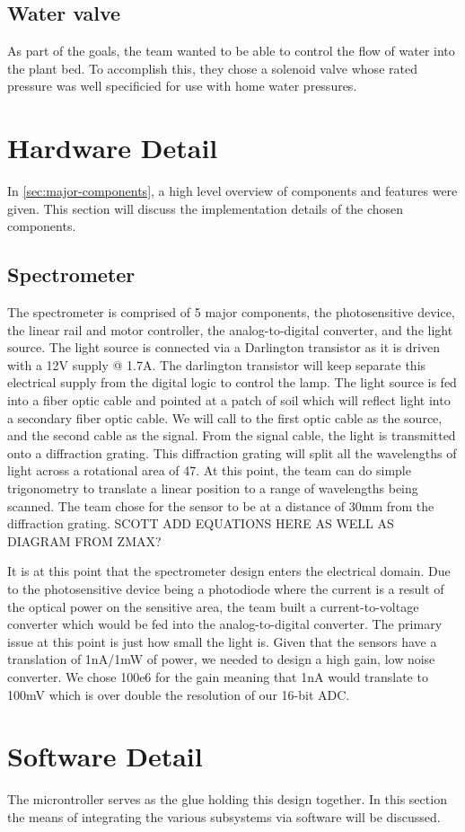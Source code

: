 \documentclass[journal]{IEEEtran}
\begin{document}
\subsection{Water valve}
As part of the goals, the team wanted to be able to control the flow of water
into the plant bed. To accomplish this, they chose a solenoid valve whose rated pressure was well specificied for use with home water pressures.
\section{Hardware Detail}
In \autoref{sec:major-components}, a high level overview of components and features were given. This
section will discuss the implementation details of the chosen components.
\subsection{Spectrometer}
The spectrometer is comprised of 5 major components, the photosensitive device, the linear rail and motor controller, the analog-to-digital converter, and the light source. The light source is connected via a Darlington transistor as it is driven with a 12V supply @ 1.7A. The darlington transistor will keep separate this electrical supply from the digital logic to control the lamp. The light source is fed into a fiber optic cable and pointed at a patch of soil which will reflect light into a secondary fiber optic cable. We will call to the first optic cable as the source, and the second cable as the signal. From the signal cable, the light is transmitted onto a diffraction grating. This diffraction grating will split all the wavelengths of light across a rotational area of 47\textdegree. At this point, the team can do simple trigonometry to translate a linear position to a range of wavelengths being scanned. The team chose for the sensor to be at a distance of 30mm from the diffraction grating. SCOTT ADD EQUATIONS HERE AS WELL AS DIAGRAM FROM ZMAX?

It is at this point that the spectrometer design enters the electrical domain. Due to the photosensitive device being a photodiode where the current is a result of the optical power on the sensitive area, the team built a current-to-voltage converter which would be fed into the analog-to-digital converter. The primary issue at this point is just how small the light is. Given that the sensors have a translation of 1nA/1mW of power, we needed to design a high gain, low noise converter. We chose 100e6 for the gain meaning that 1nA would translate to 100mV which is over double the resolution of our 16-bit ADC.
\section{Software Detail}
The microntroller serves as the glue holding this design together. In this section the means of
integrating the various subsystems via software will be discussed.
\end{document}
